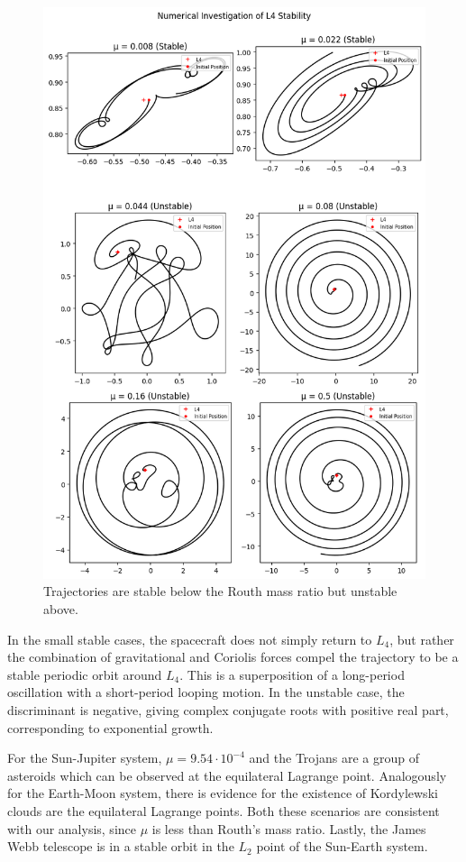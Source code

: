 \documentclass{article}
\begin{document}
\begin{figure}
    \centering
    \includegraphics[width=1\linewidth]{images/l4stability.png}
    \caption{Trajectories are stable below the Routh mass ratio but unstable above.}
\end{figure}

In the small stable cases, the spacecraft does not simply return to \(L_4\), but rather the combination of gravitational and Coriolis forces compel the trajectory to  be a stable periodic orbit around \(L_4\). This is a superposition of a long-period oscillation with a short-period looping motion. In the unstable case, the discriminant is negative, giving complex conjugate roots with positive real part, corresponding to exponential growth.

For the Sun-Jupiter system, \(\mu = 9.54 \cdot 10^{-4}\) and the Trojans are a group of asteroids which can be observed at the equilateral Lagrange point. Analogously for the Earth-Moon system, there is evidence for the existence of Kordylewski clouds are the equilateral Lagrange points. Both these scenarios are consistent with our analysis, since \(\mu\) is less than Routh's mass ratio. Lastly, the James Webb telescope is in a stable orbit in the \(L_2\) point of the Sun-Earth system.
\end{document}
